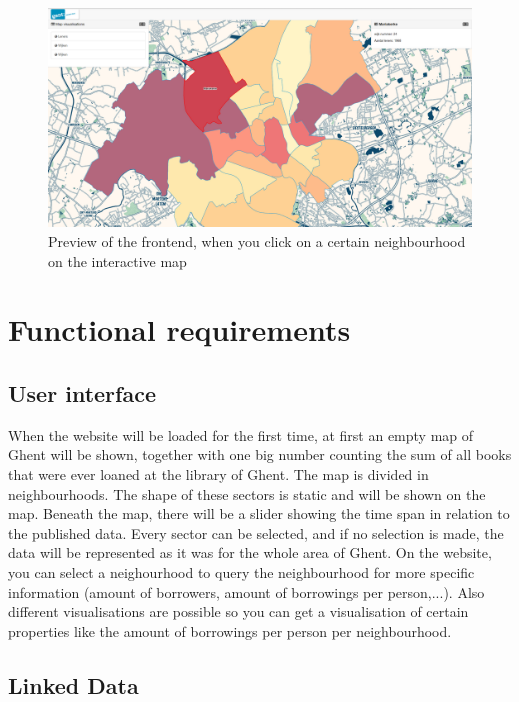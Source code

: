 \begin{figure}[h!]
  \centering
      \includegraphics[width=16cm]{fig/frontend}
 	 \caption{Preview of the frontend, when you click on a certain neighbourhood on the interactive map}
\end{figure}




\section{Functional requirements}

\subsection{User interface}

When the website will be loaded for the first time, at first an empty map of Ghent will be shown, together with one big number counting the sum of all books that were ever loaned at the library of Ghent. The map is divided in neighbourhoods. The shape of these sectors is static and will be shown on the map. Beneath the map, there will be a slider showing the time span in relation to the published data. Every sector can be selected, and if no selection is made, the data will be represented as it was for the whole area of Ghent.  On the website, you can select a neighourhood to query the neighbourhood for more specific information (amount of borrowers, amount of borrowings per person,...). Also different visualisations are possible so you can get a visualisation of certain properties like the amount of borrowings per person per neighbourhood.

\subsection{Linked Data}

